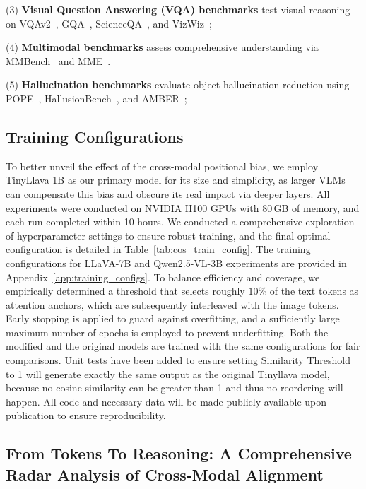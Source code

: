 \documentclass[11pt]{article}
\begin{document}
(3) \textbf{Visual Question Answering (VQA) benchmarks} test visual reasoning on VQAv2~\citep{goyal2017making}, GQA~\citep{hudson2019gqa}, ScienceQA~\citep{lu2022learn}, and VizWiz~\citep{gurari2018vizwiz}; 

(4) \textbf{Multimodal benchmarks} assess comprehensive understanding via MMBench~\citep{lu2022learn} and MME~\citep{fu2023mme}. 

(5) \textbf{Hallucination benchmarks} evaluate object hallucination reduction using POPE~\citep{li2023evaluating}, HallusionBench~\citep{guan2024hallusionbench}, and AMBER~\citep{wang2023amber};


\subsection{Training Configurations}

To better unveil the effect of the cross-modal positional bias, we employ TinyLlava 1B as our primary model for its size and simplicity, as larger VLMs can compensate this bias and obscure its real impact via deeper layers. All experiments were conducted on NVIDIA H100 GPUs with 80\,GB of memory, and each run completed within 10 hours. We conducted a comprehensive exploration of hyperparameter settings to ensure robust training, and the final optimal configuration is detailed in Table~\ref{tab:cos_train_config}. The training configurations for LLaVA-7B and Qwen2.5-VL-3B experiments are provided in Appendix~\ref{app:training_configs}. To balance efficiency and coverage, we empirically determined a threshold that selects roughly $10\%$ of the text tokens as attention anchors, which are subsequently interleaved with the image tokens. Early stopping is applied to guard against overfitting, and a sufficiently large maximum number of epochs is employed to prevent underfitting. Both the modified and the original models are trained with the same configurations for fair comparisons. Unit tests have been added to ensure setting Similarity Threshold to 1 will generate exactly the same output as the original Tinyllava model, because no cosine similarity can be greater than 1 and thus no reordering will happen. All code and necessary data will be made publicly available upon publication to ensure reproducibility.

 

\subsection{From Tokens To Reasoning: A Comprehensive Radar Analysis of Cross-Modal Alignment}
\end{document}
